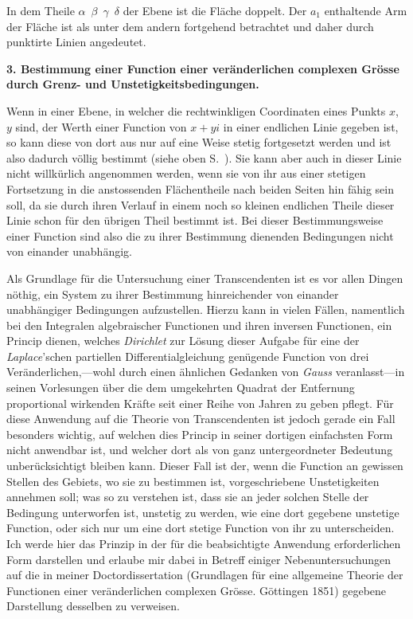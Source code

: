 \documentclass[a4paper,12pt,leqno]{article}
\begin{document}
In dem Theile $\alpha$~$\beta$~$\gamma$~$\delta$ der Ebene ist
die Fl\"{a}che doppelt.  Der $a_1$ enthaltende Arm der Fl\"{a}che
ist als unter dem andern fortgehend betrachtet und daher durch
punktirte Linien angedeutet.

\newpage

\begin{center}
\large\bfseries
3.  Bestimmung einer Function einer ver\"{a}nderlichen
complexen Gr\"{o}sse durch Grenz- und Unstetigkeitsbedingungen.
\end{center}

Wenn in einer Ebene, in welcher die rechtwinkligen Coordinaten
eines Punkts $x$, $y$ sind, der Werth einer Function von $x + yi$
in einer endlichen Linie gegeben ist, so kann diese von dort aus
nur auf eine Weise stetig fortgesetzt werden und ist also dadurch
v\"{o}llig bestimmt (siehe oben S.~\pageref{`Linie'}).  Sie kann
aber auch in dieser Linie nicht willk\"{u}rlich angenommen
werden, wenn sie von ihr aus einer stetigen Fortsetzung in die
anstossenden Fl\"{a}chentheile nach beiden Seiten hin f\"{a}hig
sein soll, da sie durch ihren Verlauf in einem noch so kleinen
endlichen Theile dieser Linie schon f\"{u}r den \"{u}brigen Theil
bestimmt ist.  Bei dieser Bestimmungsweise einer Function sind
also die zu ihrer Bestimmung dienenden Bedingungen nicht von
einander unabh\"{a}ngig.

Als Grundlage f\"{u}r die Untersuchung einer Transcendenten ist
es vor allen Dingen n\"{o}thig, ein System zu ihrer Bestimmung
hinreichender von einander unabh\"{a}ngiger Bedingungen
aufzustellen.  Hierzu kann in vielen F\"{a}llen, namentlich bei
den Integralen algebraischer Functionen und ihren inversen
Functionen, ein Princip dienen, welches \emph{Dirichlet} zur
L\"{o}sung dieser Aufgabe f\"{u}r eine der \emph{Laplace}'schen
partiellen Differentialgleichung gen\"{u}gende Function von drei
Ver\"{a}nderlichen,---wohl durch einen \"{a}hnlichen Gedanken von
\emph{Gauss} veranlasst---in seinen Vorlesungen \"{u}ber die
dem umgekehrten Quadrat der Entfernung proportional wirkenden
Kr\"{a}fte seit einer Reihe von Jahren zu geben pflegt.  F\"{u}r
diese Anwendung auf die Theorie von Transcendenten ist jedoch
gerade ein Fall besonders wichtig, auf welchen dies Princip in
seiner dortigen einfachsten Form nicht anwendbar ist, und welcher
dort als von ganz untergeordneter Bedeutung unber\"{u}cksichtigt
bleiben kann.  Dieser Fall ist der, wenn die Function an gewissen
Stellen des Gebiets, wo sie zu bestimmen ist, vorgeschriebene
Unstetigkeiten annehmen soll; was so zu verstehen ist, dass sie
an jeder solchen Stelle der Bedingung unterworfen ist, unstetig
zu werden, wie eine dort gegebene unstetige Function, oder sich
nur um eine dort stetige Function von ihr zu unterscheiden.  Ich
werde hier das Prinzip in der f\"{u}r die beabsichtigte Anwendung
erforderlichen Form darstellen und erlaube mir dabei in Betreff
einiger Nebenuntersuchungen auf die in meiner Doctordissertation
(Grundlagen f\"{u}r eine allgemeine Theorie der Functionen einer
ver\"{a}nderlichen complexen Gr\"{o}sse.   G\"{o}ttingen 1851)
gegebene Darstellung desselben zu verweisen.
\end{document}
